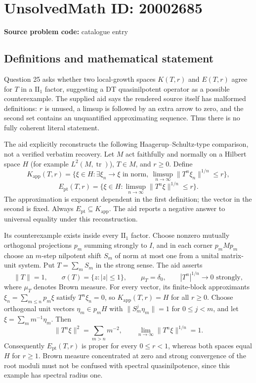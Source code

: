 \documentclass[11pt]{article}
\begin{document}
\section*{UnsolvedMath ID: 20002685}
\textbf{Source problem code:} catalogue entry
\subsection{Definitions and mathematical statement}
Question 25 asks whether two local-growth spaces $K(T,r)$ and $E(T,r)$ agree for $T$ in a $\mathrm{II}_1$ factor, suggesting a DT quasinilpotent operator as a possible counterexample. The supplied aid says the rendered source itself has malformed definitions: $r$ is unused, a limsup is followed by an extra arrow to zero, and the second set contains an unquantified approximating sequence. Thus there is no fully coherent literal statement.

The aid explicitly reconstructs the following Haagerup--Schultz-type comparison, not a verified verbatim recovery. Let $M$ act faithfully and normally on a Hilbert space $H$ (for example $L^2(M,\operatorname{tr})$), $T\in M$, and $r\geq0$. Define
\[
K_{\mathrm{app}}(T,r)=\{\xi\in H:\exists\xi_n\to\xi\text{ in norm},\ \limsup_{n\to\infty}\|T^n\xi_n\|^{1/n}\leq r\},
\]
\[
E_{\mathrm{pt}}(T,r)=\{\xi\in H:\limsup_{n\to\infty}\|T^n\xi\|^{1/n}\leq r\}.
\]
The approximation is exponent dependent in the first definition; the vector in the second is fixed. Always $E_{\mathrm{pt}}\subseteq K_{\mathrm{app}}$. The aid reports a negative answer to universal equality under this reconstruction.

Its counterexample exists inside every $\mathrm{II}_1$ factor. Choose nonzero mutually orthogonal projections $p_m$ summing strongly to $I$, and in each corner $p_mMp_m$ choose an $m$-step nilpotent shift $S_m$ of norm at most one from a unital matrix-unit system. Put $T=\sum_mS_m$ in the strong sense. The aid asserts
\[
\|T\|=1,\qquad\sigma(T)=\{z:|z|\leq1\},\qquad
\mu_T=\delta_0,\qquad |T^n|^{1/n}\to0\text{ strongly},
\]
where $\mu_T$ denotes Brown measure. For every vector, its finite-block approximants $\xi_n=\sum_{m\leq n}p_m\xi$ satisfy $T^n\xi_n=0$, so $K_{\mathrm{app}}(T,r)=H$ for all $r\geq0$. Choose orthogonal unit vectors $\eta_m\in p_mH$ with $\|S_m^j\eta_m\|=1$ for $0\leq j<m$, and let $\xi=\sum_m m^{-1}\eta_m$. Then
\[
\|T^n\xi\|^2=\sum_{m>n}m^{-2},\qquad
\lim_{n\to\infty}\|T^n\xi\|^{1/n}=1.
\]
Consequently $E_{\mathrm{pt}}(T,r)$ is proper for every $0\leq r<1$, whereas both spaces equal $H$ for $r\geq1$. Brown measure concentrated at zero and strong convergence of the root moduli must not be confused with spectral quasinilpotence, since this example has spectral radius one.
\end{document}
